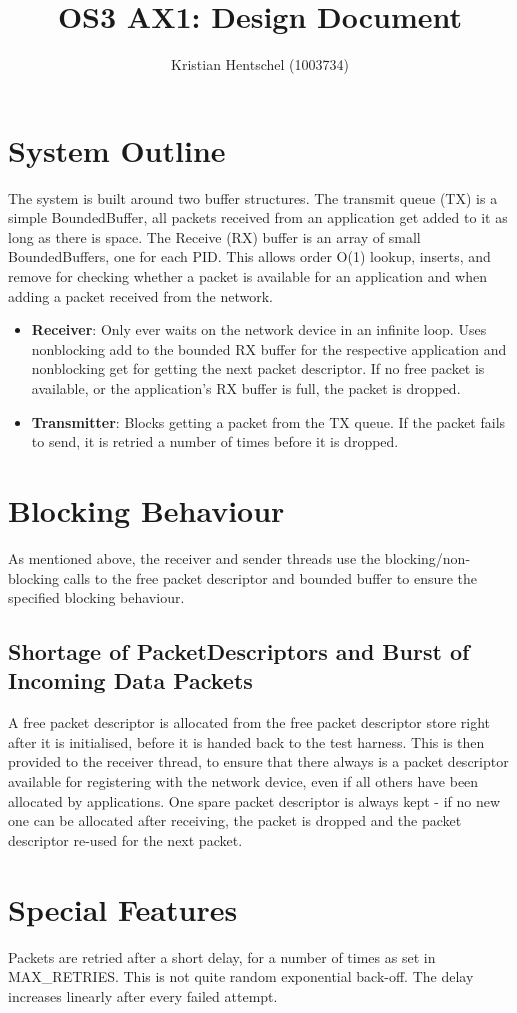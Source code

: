 \documentclass{article}
\title{OS3 AX1: Design Document}
\author{Kristian Hentschel (1003734)}
\begin{document}
\maketitle
\section{System Outline}

The system is built around two buffer structures.
The transmit queue (TX) is a simple BoundedBuffer, all packets received from an application get added to it as long as there is space.
The Receive (RX) buffer is an array of small BoundedBuffers, one for each PID. This allows order O(1) lookup, inserts, and remove for checking whether a packet is available for an application and when adding a packet received from the network.

\begin{itemize}
	\item \textbf{Receiver}: Only ever waits on the network device in an infinite loop. Uses nonblocking add to the bounded RX buffer for the respective application and nonblocking get for getting the next packet descriptor. If no free packet is available, or the application's RX buffer is full, the packet is dropped.
	\item \textbf{Transmitter}: Blocks getting a packet from the TX queue. If the packet fails to send, it is retried a number of times before it is dropped.
\end{itemize}

\section{Blocking Behaviour}
As mentioned above, the receiver and sender threads use the blocking/non-blocking calls to the free packet descriptor and bounded buffer to ensure the specified blocking behaviour.

\subsection{Shortage of PacketDescriptors and Burst of Incoming Data Packets}
A free packet descriptor is allocated from the free packet descriptor store right after it is initialised, before it is handed back to the test harness. This is then provided to the receiver thread, to ensure that there always is a packet descriptor available for registering with the network device, even if all others have been allocated by applications. One spare packet descriptor is always kept - if no new one can be allocated after receiving, the packet is dropped and the packet descriptor re-used for the next packet.

\section{Special Features}
Packets are retried after a short delay, for a number of times as set in MAX\_RETRIES. This is not quite random exponential back-off. The delay increases linearly after every failed attempt.
\end{document}
